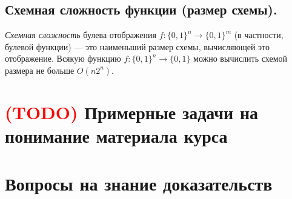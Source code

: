 \documentclass{article}
\begin{document}
\subsection{Схемная сложность функции (размер схемы).}
\textit{Схемная сложность} булева отображения $f : \{0, 1\}^n \to \{0, 1\}^m$ (в частности, булевой функции) — это наименьший размер схемы, вычисляющей это отображение.
\newline
\newline
Всякую функцию $f : \{0, 1\}^n \to \{0, 1\}$ можно вычислить схемой размера не больше $O(n2^n)$.




\newpage


\section{\textcolor{red}{(TODO)} Примерные задачи на понимание материала курса}
 
\subsection*{\normalsize{}} 

\newpage




\section{Вопросы на знание доказательств}
\end{document}
